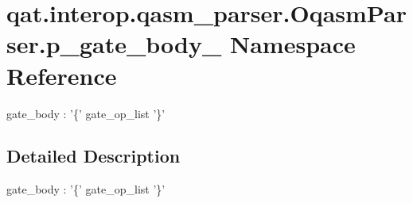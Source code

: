 \hypertarget{namespaceqat_1_1interop_1_1qasm__parser_1_1OqasmParser_1_1p__gate__body__1}{\section{qat.\-interop.\-qasm\-\_\-parser.\-Oqasm\-Parser.\-p\-\_\-gate\-\_\-body\-\_ Namespace Reference}
\label{namespaceqat_1_1interop_1_1qasm__parser_1_1OqasmParser_1_1p__gate__body__1}
}


gate\-\_\-body \-: '\{' gate\-\_\-op\-\_\-list '\}'  




\subsection{Detailed Description}
gate\-\_\-body \-: '\{' gate\-\_\-op\-\_\-list '\}' 